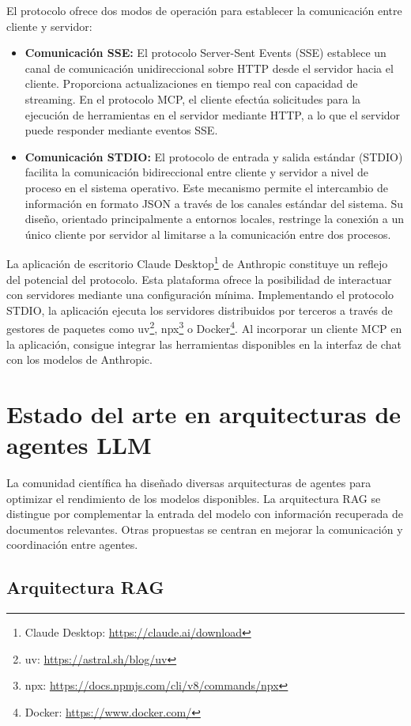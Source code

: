 El protocolo ofrece dos modos de operación para establecer la comunicación entre cliente y servidor:
\begin{itemize}
  \item{\textbf{Comunicación SSE: } El protocolo Server-Sent Events (SSE) establece un canal de comunicación unidireccional sobre HTTP desde el servidor hacia el cliente. Proporciona actualizaciones en tiempo real con capacidad de streaming. En el protocolo MCP, el cliente efectúa solicitudes para la ejecución de herramientas en el servidor mediante HTTP, a lo que el servidor puede responder mediante eventos SSE.}
\item{\textbf{Comunicación STDIO: } El protocolo de entrada y salida estándar (STDIO) facilita la comunicación bidireccional entre cliente y servidor a nivel de proceso en el sistema operativo. Este mecanismo permite el intercambio de información en formato JSON a través de los canales estándar del sistema. Su diseño, orientado principalmente a entornos locales, restringe la conexión a un único cliente por servidor al limitarse a la comunicación entre dos procesos.}
\end{itemize}
La aplicación de escritorio Claude Desktop\footnote{Claude Desktop: \url{https://claude.ai/download}} de Anthropic constituye un reflejo del potencial del protocolo. Esta plataforma ofrece la posibilidad de interactuar con servidores mediante una configuración mínima. Implementando el protocolo STDIO, la aplicación ejecuta los servidores distribuidos por terceros a través de gestores de paquetes como uv\footnote{uv: \url{https://astral.sh/blog/uv}}, npx\footnote{npx: \url{https://docs.npmjs.com/cli/v8/commands/npx}} o Docker\footnote{Docker: \url{https://www.docker.com/}}. Al incorporar un cliente MCP en la aplicación, consigue integrar las herramientas disponibles en la interfaz de chat con los modelos de Anthropic.

\section{Estado del arte en arquitecturas de agentes LLM}


La comunidad científica ha diseñado diversas arquitecturas de agentes para optimizar el rendimiento de los modelos disponibles. La arquitectura RAG se distingue por complementar la entrada del modelo con información recuperada de documentos relevantes. Otras propuestas se centran en mejorar la comunicación y coordinación entre agentes.

\subsection{Arquitectura RAG}

